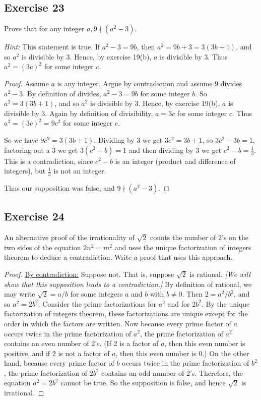 \documentclass[14pt]{extarticle}
\begin{document}
\subsection{Exercise 23}
Prove that for any integer $a, 9 \nmid (a^2 - 3).$

{\it Hint:} This statement is true. If $a^2 - 3 = 9b$, then
$a^2 = 9b + 3 = 3(3b + 1)$, and so $a^2$ is divisible by 3.
Hence, by exercise 19(b), $a$ is divisible by 3. Thus
$a^2 = (3c)^2$ for some integer $c$.

\begin{proof}
Assume $a$ is any integer. Argue by contradiction and assume 9 divides $a^2 - 3$. By definition of divides, $a^2 - 3 = 9b$ for some integer $b$. So $a^2 = 3(3b + 1)$, and so $a^2$ is divisible by 3. Hence, by exercise 19(b), $a$ is divisible by 3. Again by definition of divisibility, $a = 3c$ for some integer $c$. Thus $a^2 = (3c)^2 = 9c^2$ for some integer $c$. 

So we have $9c^2 = 3(3b+1)$. Dividing by 3 we get $3c^2 = 3b+1$, so $3c^2 - 3b = 1$, factoring out a 3 we get $3(c^2 - b) = 1$ and then dividing by 3 we get $c^2 - b = \frac{1}{3}$. This is a contradiction, since $c^2 - b$ is an integer (product and difference of integers), but $\frac{1}{3}$ is not an integer.

Thus our supposition was false, and $9 \nmid (a^2 - 3)$.
\end{proof}

\subsection{Exercise 24}
An alternative proof of the irrationality of $\sqrt{2}$ counts the number of 2’s on the two sides of the equation $2n^2 = m^2$ and uses the unique factorization of integers theorem to deduce a contradiction. Write a proof that uses this approach.

\begin{proof}
\underline{By contradiction:} Suppose not. That is, suppose
$\sqrt{2}$ is rational. {\it [We will show that this supposition leads to a contradiction.]} By definition of rational, we may write $\sqrt{2} = a/b$ for some integers $a$ and $b$ with $b \neq 0$. Then $2 = a^2/b^2$, and so $a^2 = 2b^2$. Consider the prime factorizations for $a^2$ and for $2b^2$. By the unique factorization of integers theorem, these factorizations are unique except for the order in which the factors are written. Now because every prime factor of $a$ occurs twice in the prime factorization of $a^2$, the prime factorization of $a^2$ contains an even number of 2’s. (If 2 is a factor of $a$, then this even number is positive, and if 2 is not a factor of $a$, then this even number is 0.) On the other hand, because every prime factor of $b$ occurs twice in the prime factorization of $b^2$, the prime factorization of $2b^2$ contains an odd number of 2’s. Therefore, the equation $a^2 = 2b^2$ cannot be true. So the supposition is false, and hence $\sqrt{2}$ is irrational.
\end{proof}
\end{document}
